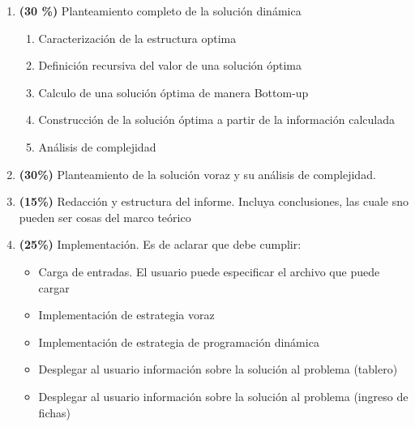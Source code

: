 \documentclass[twocolumn]{article}
\begin{document}
\begin{enumerate}
	\item \textbf{(30 \%)} Planteamiento completo de la solución dinámica
	\begin{enumerate}
		\item Caracterización de la estructura optima
		\item Definición recursiva del valor de una solución óptima
		\item Calculo de una solución óptima de manera Bottom-up
		\item Construcción de la solución óptima a partir de la información calculada
		\item Análisis de complejidad
	\end{enumerate}
	\item \textbf{(30\%)} Planteamiento de la solución voraz y su análisis de complejidad.
	\item \textbf{(15\%)} Redacción y estructura del informe. Incluya conclusiones, las cuale sno pueden ser cosas del marco teórico
	\item \textbf{(25\%)} Implementación. Es de aclarar que debe cumplir:
	\begin{itemize}
		\item Carga de entradas. El usuario puede especificar el archivo que puede cargar
		\item Implementación de estrategia voraz
		\item Implementación de estrategia de programación dinámica
		\item Desplegar al usuario información sobre la solución al problema (tablero)
		\item Desplegar al usuario información sobre la solución al problema (ingreso de fichas)
	\end{itemize}

\end{enumerate}
\end{document}
